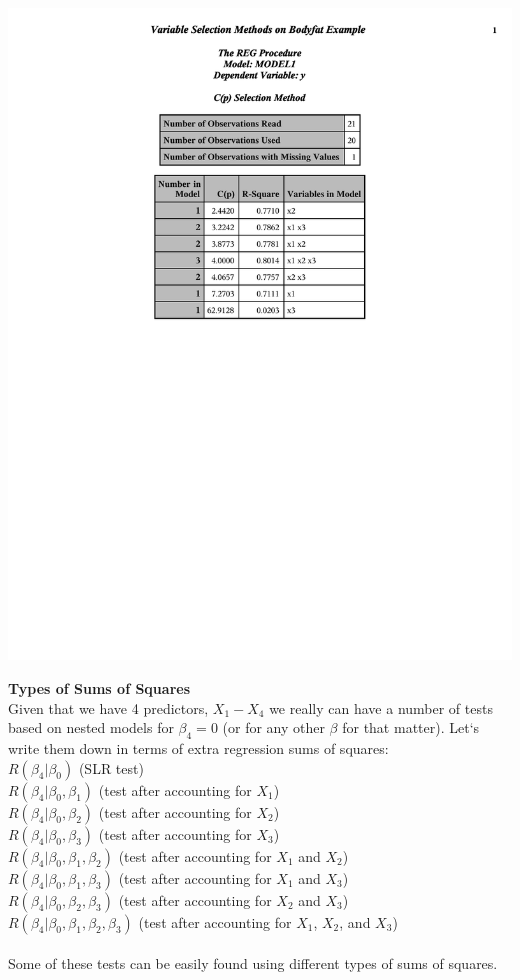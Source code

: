 \begin{center}
\begin{tabular}{cc}
\end{tabular}
\includegraphics[page=5,scale=0.6,trim=40mm 120mm 80mm 10mm]{bodyfatexampleselection}
\end{center}

\textbf{Types of Sums of Squares}\\
Given that we have 4 predictors, $X_1-X_4$ we really can have a number of tests based on nested models for $\beta_4=0$ (or for any other $\beta$ for that matter).  Let`s write them down in terms of extra regression sums of squares:\\
$R(\beta_4|\beta_0)$ (SLR test)\\
$R(\beta_4|\beta_0,\beta_1)$ (test after accounting for $X_1$)\\
$R(\beta_4|\beta_0,\beta_2)$ (test after accounting for $X_2$)\\
$R(\beta_4|\beta_0,\beta_3)$ (test after accounting for $X_3$)\\
$R(\beta_4|\beta_0,\beta_1,\beta_2)$ (test after accounting for $X_1$ and $X_2$)\\
$R(\beta_4|\beta_0,\beta_1,\beta_3)$ (test after accounting for $X_1$ and $X_3$)\\
$R(\beta_4|\beta_0,\beta_2,\beta_3)$ (test after accounting for $X_2$ and $X_3$)\\
$R(\beta_4|\beta_0,\beta_1,\beta_2,\beta_3)$ (test after accounting for $X_1$, $X_2$, and $X_3$)\\~\\
Some of these tests can be easily found using different types of sums of squares.


